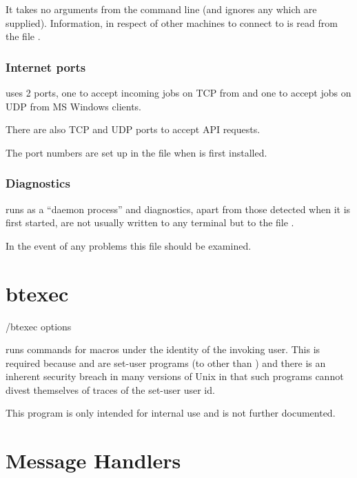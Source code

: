 It takes no arguments from the command line (and ignores any which are supplied). Information, in respect of other machines to connect to is
read from the file \hostsfile.

\subsubsection{Internet ports}
 uses 2 ports, one to accept incoming jobs on TCP from \PrRbtr{} and one to accept jobs on UDP from MS Windows clients.


There are also TCP and UDP ports to accept API requests.

The port numbers are set up in the  file when \ProductName{} is first installed.

\subsubsection{Diagnostics}
 runs as a ``daemon process'' and diagnostics, apart from those detected when
it is first started, are not usually written to any terminal but to the file .

In the event of any problems this file should be examined.

\section{btexec}

\begin{expara}

\progsdirname/btexec options

\end{expara}

 runs commands for macros under the identity of the invoking user.
This is required because \PrBtq{} and \PrXmbtq{} are set-user programs (to other than ) and there is an inherent security breach in
many versions of Unix in that such programs cannot divest themselves of traces of the set-user user id.

This program is only intended for internal use and is not further documented.

\section{Message Handlers}
